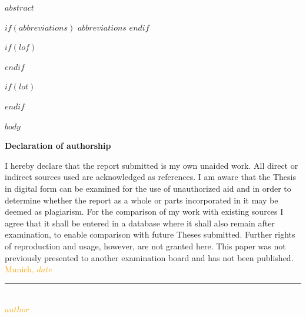 \documentclass[12pt]{article}
\begin{document}
\newpage
$abstract$

\newpage
\tableofcontents
\clearpage

$if(abbreviations)$
\newpage
$abbreviations$
$endif$

$if(lof)$
\newpage
\listoffigures
{}
$endif$

$if(lot)$
\newpage
\listoftables
{}
$endif$

\newpage
\pagestyle{plain}
\setcounter{page}{1}    %

$body$



\Large
\noindent
\textbf{Declaration of authorship}
\vspace{0.5cm}
\noindent
\normalsize

I hereby declare that the report submitted is my own unaided work. All direct
or indirect sources used are acknowledged as references. I am aware that the
Thesis in digital form can be examined for the use of unauthorized aid and in
order to determine whether the report as a whole or parts incorporated in it may
be deemed as plagiarism. For the comparison of my work with existing sources I
agree that it shall be entered in a database where it shall also remain after
examination, to enable comparison with future Theses submitted. Further rights
of reproduction and usage, however, are not granted here. This paper was not
previously presented to another examination board and has not been published.
\\

\vspace{1cm}
\textcolor{orange}{Munich, $date$} \\

\vspace{3cm}

\noindent\rule{0.5\textwidth}{0.4pt} \\

\textcolor{orange}{$author$}

\end{document}

